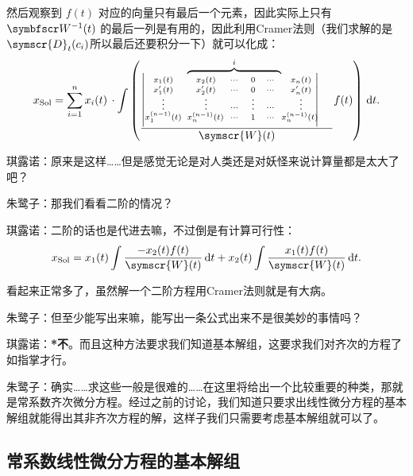然后观察到 \(f(t)\) 对应的向量只有最后一个元素，因此实际上只有 \( \symbfscr W^{-1}(t)\) 的最后一列是有用的，因此利用Cramer法则（我们求解的是 \( \symscr{D} _t(c_i)\)所以最后还要积分一下）就可以化成：
\[
	x_{\rm Sol}= \sum_{i=1}^{n} x_i(t) \, \cdot \int\left(  \raisebox{-2.5em}{\(\dfrac{{
					\begin{vmatrix}
						\scriptstyle x_1(t)         & \scriptstyle x_2(t)                       & \scriptstyle \cdots & \scriptstyle 0      & \scriptstyle \cdots & \scriptstyle x_n(t)                     \\[-3pt]
						\scriptstyle x_1'(t)        & \scriptstyle x_2'(t)                      & \scriptstyle \cdots & \scriptstyle 0      & \scriptstyle \cdots & \scriptstyle x_n'(t)                    \\[-3pt]
						\scriptstyle \vdots         & \scriptstyle \vdots                       & \scriptstyle \cdots & \scriptstyle \vdots & \scriptstyle \cdots & \scriptstyle \vdots                     \\[-3pt]
						\scriptstyle x_1^{(n-1)}(t) & \!\! \!\scriptstyle x_n^{(n-1)}(t) \!\!\! & \scriptstyle \cdots & \scriptstyle 1      & \scriptstyle \cdots & \!\! \!\scriptstyle x_n^{(n-1)}(t) \!\! \\[3pt]
					\end{vmatrix}\kern-4em\raisebox{1.8em}{$\kern-8em\overset{i}{\overbrace{\phantom{zzxvxvxvxx3wixcb}}}$\kern 4.6em}}}{\symscr{W} (t)}\)}f(t) \right) \,\mathrm{d}t
	.\]

琪露诺：原来是这样……但是感觉无论是对人类还是对妖怪来说计算量都是太大了吧？

朱鹭子：那我们看看二阶的情况？

琪露诺：二阶的话也是代进去嘛，不过倒是有计算可行性：
\[
	x_{\rm Sol}= x_1(t)\int \dfrac{-x_2(t)f(t)}{\symscr{W}(t)}  \,\mathrm{d}t+x_2(t)\int \dfrac{x_1(t)f(t)}{\symscr{W}(t) } \,\mathrm{d}t
	.\]

看起来正常多了，虽然解一个二阶方程用Cramer法则就是有大病。

朱鹭子：但至少能写出来嘛，能写出一条公式出来不是很美妙的事情吗？

琪露诺：\textbf{*不}。而且这种方法要求我们知道基本解组，这要求我们对齐次的方程了如指掌才行。

朱鹭子：确实……求这些一般是很难的……在这里将给出一个比较重要的种类，那就是常系数齐次微分方程。经过之前的讨论，我们知道只要求出线性微分方程的基本解组就能得出其非齐次方程的解，这样子我们只需要考虑基本解组就可以了。

\subsection{常系数线性微分方程的基本解组}

